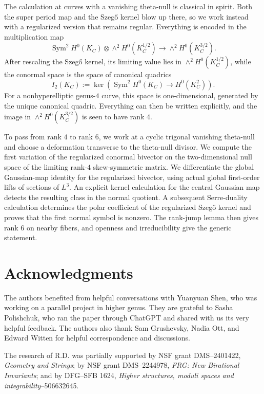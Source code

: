 \documentclass[10pt,a4paper]{amsart}
\newcommand{\Sym}{\operatorname{Sym}}
\begin{document}
The calculation at curves with a vanishing theta-null is classical in spirit.
Both the super period map and the Szeg\H{o} kernel blow up there,
so we work instead with a regularized version that remains regular.
Everything is encoded in the multiplication map
\[
\Sym^2 H^0(K_C)\otimes \wedge^2 H^0(K_C^{1/2})
\longrightarrow
\wedge^2 H^0(K_C^{3/2}).
\]
After rescaling the Szeg\H{o} kernel, its limiting value lies in
$\wedge^2 H^0(K_C^{1/2})$, while the conormal space is the space of canonical quadrics
\[
I_2(K_C):=\ker\!\left(
\operatorname{Sym}^2 H^0(K_C)\longrightarrow H^0(K_C^2)
\right).
\]
{For a nonhyperelliptic genus-$4$ curve,} this space is one-dimensional, generated by the unique canonical quadric.
Everything can then be written explicitly, and the image in
$\wedge^2 H^0(K_C^{3/2})$ is seen to have rank $4$.

To pass from rank $4$ to rank $6$, we work at a cyclic trigonal vanishing theta-null
and choose a deformation transverse to the theta-null divisor.  We compute the first variation
of the {regularized conormal bivector} on the two-dimensional null space of the limiting rank-$4$ skew-symmetric matrix.
\begingroup
We differentiate the global Gaussian-map identity for the regularized
bivector, using actual global first-order lifts of sections of $L^3$.
An explicit kernel calculation for the central Gaussian map detects the
resulting class in the normal quotient. A subsequent Serre-duality
calculation determines the polar coefficient of the regularized
Szeg\H{o} kernel and proves that the first normal symbol is nonzero.
The rank-jump lemma then gives rank $6$ on nearby fibers, and openness
and irreducibility give the generic statement.
\endgroup


\section*{Acknowledgments}

The authors benefited from helpful conversations with Yuanyuan Shen,
who was working on a parallel project in higher genus.
They are grateful to Sasha Polishchuk, who ran the paper through ChatGPT
and shared with us its very helpful feedback.
The authors also thank Sam Grushevsky, Nadia Ott, and Edward
Witten for helpful correspondence and discussions.

The research of R.D. was partially supported 
by NSF grant DMS--2401422, \emph{Geometry and Strings};
by NSF grant DMS--2244978, \emph{FRG: New Birational Invariants}; 
and by DFG--SFB 1624, \emph{Higher structures, moduli spaces and integrability}--506632645.
\end{document}

